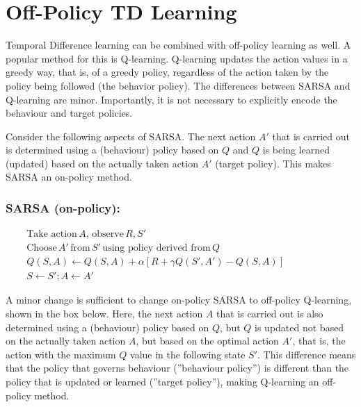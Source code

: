 \section{Off-Policy TD Learning}

Temporal Difference learning can be combined with off-policy learning as well. A popular method for this is Q-learning. Q-learning updates the action values in a greedy way, that is, of a greedy policy, regardless of the action taken by the policy being followed (the behavior policy). The differences between SARSA and Q-learning are minor. Importantly, it is not necessary to explicitly encode the behaviour and target policies.

Consider the following aspects of SARSA. The next action $A'$ that is carried out is determined using a (behaviour) policy based on $Q$ and $Q$ is being learned (updated) based on the actually taken action $A'$ (target policy). This makes SARSA an on-policy method.

\begin{tcolorbox}[colback=code]
\setlength{\abovedisplayskip}{0pt}
\setlength{\belowdisplayskip}{0pt}
\setlength{\abovedisplayshortskip}{0pt}
\setlength{\belowdisplayshortskip}{0pt}
\subsubsection*{SARSA (on-policy):} 

\begin{align*}
& \text{Take action}\, A, \, \text{observe} \, R, S' \\
& \text{Choose}\, A' \, \text{from}\, S' \, \text{using policy derived from} \, Q \\ 
&  Q(S, A) \leftarrow Q(S, A) + \alpha \left[ R + \gamma Q(S', A') - Q(S, A) \right] \hspace{1in}\\
&  S \leftarrow S'; A \leftarrow A'
\end{align*}
\end{tcolorbox}

A minor change is sufficient to change on-policy SARSA to off-policy Q-learning, shown in the box below. Here, the next action $A$ that is carried out is also determined using a (behaviour) policy based on $Q$, but $Q$ is updated not based on the actually taken action $A$, but based on the optimal action $A'$, that is, the action with the maximum $Q$ value in the following state $S'$. This difference means that the policy that governs behaviour (''behaviour policy'') is different than the policy that is updated or learned (''target policy''), making Q-learning an off-policy method. 

